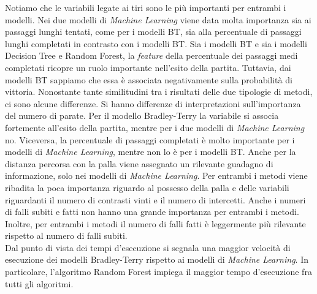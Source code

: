 Notiamo che le variabili legate ai tiri sono le più importanti per entrambi i modelli. Nei due modelli di \emph{Machine Learning} viene data molta importanza sia ai passaggi lunghi tentati, come per i modelli BT, sia alla percentuale di passaggi lunghi completati in contrasto con i modelli BT. 
Sia i modelli BT e sia i modelli Decision Tree e Random Forest, la \emph{feature} della percentuale dei passaggi medi completati ricopre un ruolo importante nell'esito della partita. Tuttavia, dai modelli BT sappiamo che essa è associata negativamente sulla probabilità di vittoria.
Nonostante tante similitudini tra i risultati delle due tipologie di metodi, ci sono alcune differenze. Si hanno differenze di interpretazioni sull'importanza del numero di parate. Per il modello Bradley-Terry la variabile si associa fortemente all'esito della partita, mentre per i due modelli di \emph{Machine Learning} no. Viceversa, la percentuale di passaggi completati è molto importante per i  modelli di \emph{Machine Learning}, mentre non lo è per i modelli BT. Anche per la distanza percorsa con la palla viene assegnato un rilevante guadagno di informazione, solo nei modelli di \emph{Machine Learning}. Per entrambi i metodi viene ribadita la poca importanza riguardo al possesso della palla e delle variabili riguardanti il numero di contrasti vinti e il numero di intercetti. Anche i numeri di falli subiti e fatti non hanno una grande importanza per entrambi i metodi. Inoltre, per entrambi i metodi il numero di falli fatti è leggermente più rilevante rispetto al numero di falli subiti.\\
Dal punto di vista dei tempi d'esecuzione si segnala una maggior velocità di esecuzione dei modelli Bradley-Terry rispetto ai modelli di \emph{Machine Learning}. In particolare, l'algoritmo Random Forest impiega il maggior tempo d'esecuzione fra tutti gli algoritmi.


